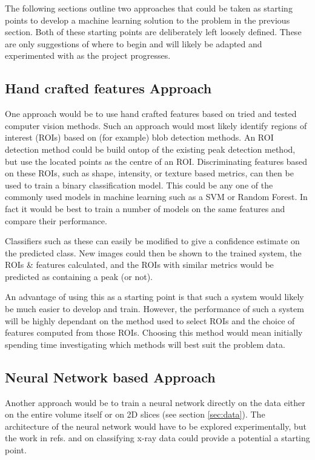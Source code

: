 \documentclass[paper=a4, fontsize=8pt]{scrartcl} \usepackage[T1]{fontenc}
\begin{document}
The following sections outline two approaches that could be taken as 
starting points to develop a machine learning solution to the problem in the 
previous section. Both of these starting points are deliberately left loosely
defined. These are only suggestions of where to begin and will likely be
adapted and experimented with as the project progresses.

\subsection{Hand crafted features Approach}
One approach would be to use hand crafted features based on tried and tested
computer vision methods. Such an approach would most likely identify regions of
interest (ROIs) based on (for example) blob detection methods. An ROI detection
method could be build ontop of the existing peak detection method, but use the 
located points as the centre of an ROI. Discriminating 
features based on these ROIs, such as shape, intensity, or texture based metrics, 
can then be used to train a binary classification model. This could be any one of the 
commonly used models in machine learning such as a SVM or Random Forest. In fact 
it would be best to train a number of models on the same features and 
compare their performance. 

Classifiers such as these can easily be modified to 
give a confidence estimate on the predicted class. New images could then be 
shown to the trained system, the ROIs \& features calculated, and the ROIs with 
similar metrics would be predicted as containing a peak (or not).

An advantage of using this as a starting point is that such a system would
likely be much easier to develop and train. However, the performance of such a
system will be highly dependant on the method used to select ROIs and the choice of
features computed from those ROIs. Choosing this method would mean initially 
spending time investigating which methods will best suit the problem data.

\subsection{Neural Network based Approach}
Another approach would be to train a neural network directly on the data either
on the entire volume itself or on 2D slices (see section \ref{sec:data}). The 
architecture of the neural network would have to be explored experimentally, but 
the work in refs. \cite{wang2016x} and \cite{kiapour2014materials} on 
classifying x-ray data could provide a potential a starting point. 
\end{document}
